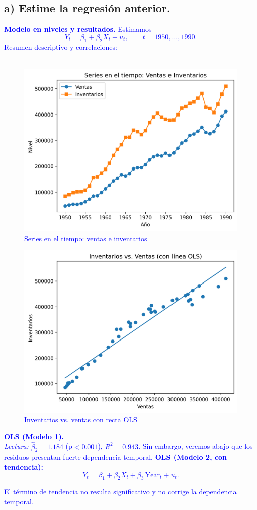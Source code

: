 \documentclass[10pt]{article}
\begin{document}
\subsection{a) Estime la regresión anterior.}
\textcolor{blue}{
\textbf{Modelo en niveles y resultados.} Estimamos
\begin{equation*}
Y_t = \beta_1 + \beta_2 X_t + u_t,\qquad t=1950,\dots,1990.
\end{equation*}
Resumen descriptivo y correlaciones:\\
\\

\begin{figure}[H]
    \centering
    \includegraphics[width=0.75\linewidth]{../plots/python/ex8/ex8_series_ventas_inventarios.png}
    \caption{Series en el tiempo: ventas e inventarios}
\end{figure}
\begin{figure}[H]
    \centering
    \includegraphics[width=0.6\linewidth]{../plots/python/ex8/ex8_scatter_inv_vs_sales.png}
    \caption{Inventarios vs. ventas con recta OLS}
\end{figure}
\textbf{OLS (Modelo 1).}\\

\textit{Lectura:} $\hat\beta_2=1.184$ (p$<0.001$), $R^2=0.943$. Sin embargo, veremos abajo que los residuos presentan fuerte dependencia temporal.
\textbf{OLS (Modelo 2, con tendencia):}
\begin{equation*}
Y_t = \beta_1 + \beta_2 X_t + \beta_3\,\text{Year}_t + u_t.
\end{equation*}

El término de tendencia no resulta significativo y no corrige la dependencia temporal.
}
\end{document}
